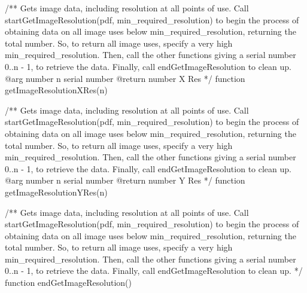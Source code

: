 /** Gets image data, including resolution at all points of use. Call
startGetImageResolution(pdf, min_required_resolution) to begin the process of
obtaining data on all image uses below min_required_resolution, returning the
total number. So, to return all image uses, specify a very high
min_required_resolution. Then, call the other functions giving a serial number
0..n - 1, to retrieve the data. Finally, call endGetImageResolution to clean
up.
@arg {number} n serial number
@return {number} X Res */
function getImageResolutionXRes(n) {}

/** Gets image data, including resolution at all points of use. Call
startGetImageResolution(pdf, min_required_resolution) to begin the process of
obtaining data on all image uses below min_required_resolution, returning the
total number. So, to return all image uses, specify a very high
min_required_resolution. Then, call the other functions giving a serial number
0..n - 1, to retrieve the data. Finally, call endGetImageResolution to clean
up.
@arg {number} n serial number
@return {number} Y Res */
function getImageResolutionYRes(n) {}

/** Gets image data, including resolution at all points of use. Call
startGetImageResolution(pdf, min_required_resolution) to begin the process of
obtaining data on all image uses below min_required_resolution, returning the
total number. So, to return all image uses, specify a very high
min_required_resolution. Then, call the other functions giving a serial number
0..n - 1, to retrieve the data. Finally, call endGetImageResolution to clean
up. */
function endGetImageResolution() {}

